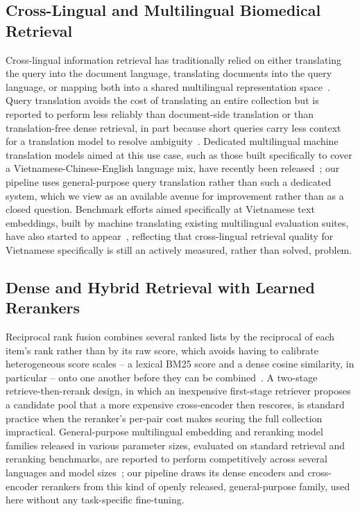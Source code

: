 \documentclass[runningheads]{llncs}
\begin{document}
\subsection{Cross-Lingual and Multilingual Biomedical Retrieval}
Cross-lingual information retrieval has traditionally relied on either
translating the query into the document language, translating documents into
the query language, or mapping both into a shared multilingual representation
space~\cite{clirudit2025}. Query translation avoids the cost of translating an
entire collection but is reported to perform less reliably than document-side
translation or than translation-free dense retrieval, in part because short
queries carry less context for a translation model to resolve
ambiguity~\cite{clirudit2025}. Dedicated multilingual machine translation
models aimed at this use case, such as those built specifically to cover a
Vietnamese-Chinese-English language mix, have recently been
released~\cite{hunyuanmt2025}; our pipeline uses general-purpose query
translation rather than such a dedicated system, which we view as an
available avenue for improvement rather than as a closed question. Benchmark
efforts aimed specifically at Vietnamese text embeddings, built by machine
translating existing multilingual evaluation suites, have also started to
appear~\cite{vnmteb2025}, reflecting that cross-lingual retrieval quality for
Vietnamese specifically is still an actively measured, rather than solved,
problem.

\subsection{Dense and Hybrid Retrieval with Learned Rerankers}
Reciprocal rank fusion combines several ranked lists by the reciprocal of
each item's rank rather than by its raw score, which avoids having to
calibrate heterogeneous score scales -- a lexical BM25 score and a dense
cosine similarity, in particular -- onto one another before they can be
combined~\cite{cormack2009rrf}. A two-stage retrieve-then-rerank design, in
which an inexpensive first-stage retriever proposes a candidate pool that a
more expensive cross-encoder then rescores, is standard practice when the
reranker's per-pair cost makes scoring the full collection impractical.
General-purpose multilingual embedding and reranking model families released
in various parameter sizes, evaluated on standard retrieval and reranking
benchmarks, are reported to perform competitively across several languages
and model sizes~\cite{qwen3embedding2025}; our pipeline draws its dense
encoders and cross-encoder rerankers from this kind of openly released,
general-purpose family, used here without any task-specific fine-tuning.
\end{document}
